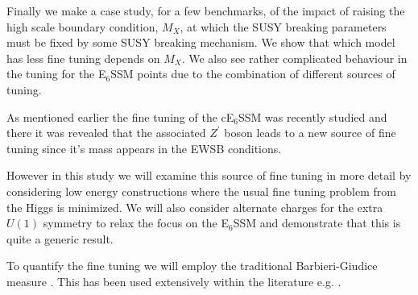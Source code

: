 \documentclass[preprint,amsmath,amssymb,aps,superscriptaddress,prd,
showpacs,floatfix,nofootinbib]{revtex4-1}
\begin{document}
Finally we make a case study, for a few benchmarks, of the impact of
raising the high scale boundary condition, $M_X$, at which the SUSY
breaking parameters must be fixed by some SUSY breaking mechanism.  We
show that which model has less fine tuning depends on $M_X$.  We also
see rather complicated behaviour in the tuning for the E$_6$SSM points
due to the combination of different sources of tuning.

As mentioned earlier the fine tuning of the cE$_6$SSM was recently studied
\cite{Athron:2013ipa} and there it was revealed that the associated
$Z^\prime$ boson leads to a new source of fine tuning since it's mass
appears in the EWSB conditions.

However in this study we will examine this source of fine tuning in more
detail by considering low energy constructions where the usual fine
tuning problem from the Higgs is minimized.  We will also consider
alternate charges for the extra $U(1)$ symmetry to relax the focus on
the E$_6$SSM and demonstrate that this is quite a generic result.

To quantify the fine tuning we will employ the traditional
Barbieri-Giudice measure \cite{Ellis:1986yg, Barbieri:1987fn}.  This
has been used extensively within the literature
e.g. \cite{deCarlos:1993yy, deCarlos:1993ca, Chankowski:1997zh,
Agashe:1997kn, Wright:1998mk, Kane:1998im, BasteroGil:1999gu,
Feng:1999zg, Allanach:2000ii, Dermisek:2005ar, Barbieri:2005kf,
Allanach:2006jc, Gripaios:2006nn, Dermisek:2006py, Barbieri:2006dq,
Kobayashi:2006fh, Perelstein:2012qg, Antusch:2012gv,Cheng:2012pe,
CahillRowley:2012rv, Ross:2012nr, Basak:2012bd, Kang:2012sy,
Athron:2013ipa,Miller:2013jra, Binjonaid:2014oga, Miller:2014jza}.
\end{document}
